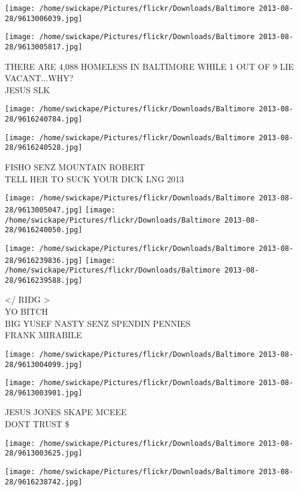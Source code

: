 \documentclass[10pt,letterpaper]{article}
\begin{document}
\texttt{[image: /home/swickape/Pictures/flickr/Downloads/Baltimore 2013-08-28/9613006039.jpg]}

\vspace{0.25in}
\texttt{[image: /home/swickape/Pictures/flickr/Downloads/Baltimore 2013-08-28/9613005817.jpg]}

THERE ARE 4,088 HOMELESS IN BALTIMORE WHILE 1 OUT OF 9 LIE VACANT...WHY?\\
JESUS SLK
\pagebreak

\texttt{[image: /home/swickape/Pictures/flickr/Downloads/Baltimore 2013-08-28/9616240784.jpg]}

\vspace{0.25in}
\texttt{[image: /home/swickape/Pictures/flickr/Downloads/Baltimore 2013-08-28/9616240528.jpg]}

FISHO SENZ MOUNTAIN ROBERT\\
TELL HER TO SUCK YOUR DICK LNG 2013
\pagebreak

\texttt{[image: /home/swickape/Pictures/flickr/Downloads/Baltimore 2013-08-28/9613005047.jpg]}
\texttt{[image: /home/swickape/Pictures/flickr/Downloads/Baltimore 2013-08-28/9616240050.jpg]}

\texttt{[image: /home/swickape/Pictures/flickr/Downloads/Baltimore 2013-08-28/9616239836.jpg]}
\texttt{[image: /home/swickape/Pictures/flickr/Downloads/Baltimore 2013-08-28/9616239588.jpg]}

</  RIDG >\\
YO BITCH\\
BIG YUSEF NASTY SENZ SPENDIN PENNIES\\
FRANK MIRABILE
\pagebreak

\texttt{[image: /home/swickape/Pictures/flickr/Downloads/Baltimore 2013-08-28/9613004099.jpg]}

\vspace{0.25in}
\texttt{[image: /home/swickape/Pictures/flickr/Downloads/Baltimore 2013-08-28/9613003901.jpg]}

JESUS JONES SKAPE MCEEE\\
DONT TRUST \$
\pagebreak

\texttt{[image: /home/swickape/Pictures/flickr/Downloads/Baltimore 2013-08-28/9613003625.jpg]}

\vspace{0.25in}
\texttt{[image: /home/swickape/Pictures/flickr/Downloads/Baltimore 2013-08-28/9616238742.jpg]}
\end{document}
